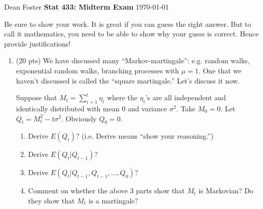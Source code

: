 \documentclass[12pt]{article}
\begin{document}
Dean Foster \hfill {\bf Stat 433: Midterm Exam} \hfill\today
\vspace{1em}

Be sure to show your work.  It is great if you can guess the right
answer.  But to call it mathematics, you need to be able to show why
your guess is correct.  Hence provide justifications!

\begin{enumerate}
\item (20 pts) We have discussed many ``Markov-martingale'': e.g.
random walks, exponential random walks, branching processes with $\mu
= 1$.  One that we haven't discussed is called the ``square
martingale.''  Let's discuss it now.

Suppose that $M_t = \sum_{i=1}^t \eta_i$ where the $\eta_i$'s are all
independent and identically distributed with mean 0 and variance
$\sigma^2$.  Take $M_0 = 0$.  Let $Q_t = M_t^2 - t\sigma^2$.
Obviously $Q_0 = 0$.
\begin{enumerate}
\item Derive $E(Q_t)$?  (i.e. Derive means ``show your reasoning.'')
\item Derive $E(Q_t|Q_{t-1})$? 
\item Derive $E(Q_t|Q_{t-1},Q_{t-1},\ldots,Q_0)$?
\item Comment on whether the above 3 parts show that $M_t$ is
  Markovian?  Do they show that $M_t$ is a martingale?
\end{enumerate}


\end{enumerate}
\end{document}
